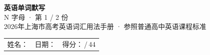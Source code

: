 \documentclass[10pt,a4paper]{article}
\begin{document}
\pagestyle{plain}

\begin{center}
{\LARGE\bfseries 英语单词默写}\\[0.22em]
{\large N 字母 · 第 1 / 2 份}\\[0.18em]
{\small 2026年上海市高考英语词汇用法手册 · 参照普通高中英语课程标准}
\end{center}

\vspace{0.25em}
\noindent\begin{tabular}{@{}p{}@{}p{}@{}p{}@{}}
姓名：\underline{\hspace{2.0cm}} & 日期：\underline{\hspace{2.0cm}} & 得分：\underline{\hspace{1.3cm}}\,/\,44 \\
\end{tabular}

\vspace{0.3em}

\vspace{0.08em}
\end{document}
